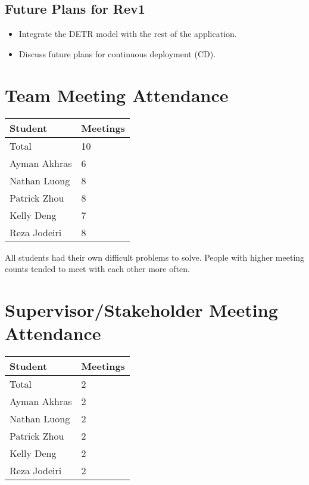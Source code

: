 \documentclass{article}
\begin{document}
\subsection{Future Plans for Rev1}
\begin{itemize}
    \item Integrate the DETR model with the rest of the application.
    
    \item Discuss future plans for continuous deployment (CD).
\end{itemize}



\section{Team Meeting Attendance}

\begin{table}[H]
\centering
\begin{tabular}{ll}
\toprule
\textbf{Student} & \textbf{Meetings}\\
\midrule
Total & 10\\
Ayman Akhras & 6\\
Nathan Luong & 8\\
Patrick Zhou & 8\\
Kelly Deng & 7\\
Reza Jodeiri & 8\\
\bottomrule
\end{tabular}
\end{table}

All students had their own difficult problems to solve. People with higher meeting counts tended to meet with each other more often.
\section{Supervisor/Stakeholder Meeting Attendance}


\begin{table}[H]
\centering
\begin{tabular}{ll}
\toprule
\textbf{Student} & \textbf{Meetings}\\
\midrule
Total & 2\\
Ayman Akhras & 2\\
Nathan Luong & 2\\
Patrick Zhou & 2\\
Kelly Deng & 2\\
Reza Jodeiri & 2\\
\bottomrule
\end{tabular}
\end{table}
\end{document}
